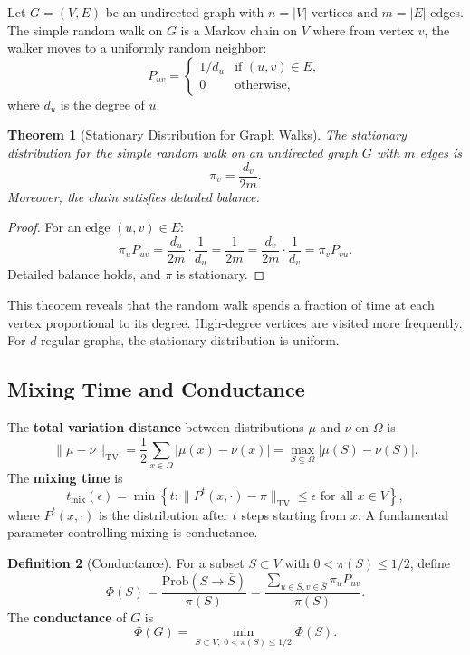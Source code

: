 \documentclass[twoside,12pt]{book}
\theoremstyle{plain}
\newtheorem{theorem}{Theorem}[chapter]
\theoremstyle{definition}
\newtheorem{definition}[theorem]{Definition}
\theoremstyle{remark}
\begin{document}
Let $G = (V, E)$ be an undirected graph with $n = |V|$ vertices and
$m = |E|$ edges. The simple random walk on $G$ is a Markov chain on $V$
where from vertex $v$, the walker moves to a uniformly random neighbor:
\[
    P_{uv} = \begin{cases} 1/d_u & \text{if } (u,v) \in E, \\ 0 &
    \text{otherwise}, \end{cases}
\]
where $d_u$ is the degree of $u$.

\begin{theorem}[Stationary Distribution for Graph Walks]\label{thm:rw-stationary}
The stationary distribution for the simple random walk on an undirected
graph $G$ with $m$ edges is
\[
    \pi_v = \frac{d_v}{2m}.
\]
Moreover, the chain satisfies detailed balance.
\end{theorem}

\begin{proof}
For an edge $(u,v) \in E$:
\[
    \pi_u P_{uv} = \frac{d_u}{2m} \cdot \frac{1}{d_u} = \frac{1}{2m}
    = \frac{d_v}{2m} \cdot \frac{1}{d_v} = \pi_v P_{vu}.
\]
Detailed balance holds, and $\pi$ is stationary.
\end{proof}

This theorem reveals that the random walk spends a fraction of time at
each vertex proportional to its degree. High-degree vertices are visited
more frequently. For $d$-regular graphs, the stationary distribution is
uniform.

\subsection{Mixing Time and Conductance}

The \textbf{total variation distance} between distributions $\mu$ and
$\nu$ on $\Omega$ is
\[
    \|\mu - \nu\|_{\mathrm{TV}} = \frac{1}{2} \sum_{x \in \Omega} |\mu(x) - \nu(x)|
    = \max_{S \subseteq \Omega} |\mu(S) - \nu(S)|.
\]
The \textbf{mixing time} is
\[
    t_{\mathrm{mix}}(\epsilon) = \min\left\{t : \|P^t(x, \cdot) -
    \pi\|_{\mathrm{TV}} \leq \epsilon \text{ for all } x \in V\right\},
\]
where $P^t(x,\cdot)$ is the distribution after $t$ steps starting from
$x$. A fundamental parameter controlling mixing is conductance.

\begin{definition}[Conductance]\label{def:conductance}
For a subset $S \subset V$ with $0 < \pi(S) \leq 1/2$, define
\[
    \Phi(S) = \frac{\text{Prob}(S \to \bar{S})}{\pi(S)}
    = \frac{\sum_{u \in S, v \in \bar{S}} \pi_u P_{uv}}{\pi(S)}.
\]
The \textbf{conductance} of $G$ is
\[
    \Phi(G) = \min_{S \subset V,\; 0 < \pi(S) \leq 1/2} \Phi(S).
\]
\end{definition}
\end{document}
